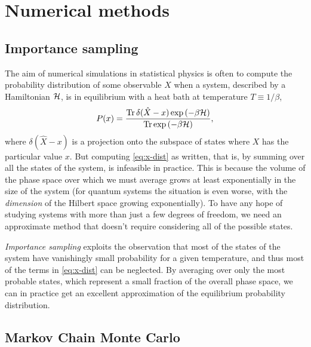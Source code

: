 \chapter{Numerical methods}
\label{chap:numerical}


\section{Importance sampling}

The aim of numerical simulations in statistical physics is often to compute the
probability distribution of some observable $X$ when a system, described by a
Hamiltonian $\mathcal{H}$, is in equilibrium with a heat bath at temperature $T \equiv
1/\beta$,
\begin{equation}
  P(x) =
  \frac{\operatorname{Tr} \delta(\hat{X}-x)\exp\left(-\beta \mathcal{H}\right)}
       {\operatorname{Tr} \exp\left(-\beta \mathcal{H}\right)},
  \label{eq:x-dist}
\end{equation}
where $\delta(\hat{X}-x)$ is a projection onto the subspace of states where $X$
has the particular value $x$. But computing \cref{eq:x-dist} as written, that
is, by summing over all the states of the system, is infeasible in practice.
This is because the volume of the phase space over which we must average grows
at least exponentially in the size of the system (for quantum systems the
situation is even worse, with the \emph{dimension} of the Hilbert space growing
exponentially). To have any hope of studying systems with more than just a few
degrees of freedom, we need an approximate method that doesn't require
considering all of the possible states.

\emph{Importance sampling} exploits the observation that most of the states of
the system have vanishingly small probability for a given temperature, and thus
most of the terms in \cref{eq:x-dist} can be neglected. By averaging over only
the most probable states, which represent a small fraction of the overall phase
space, we can in practice get an excellent approximation of the equilibrium
probability distribution.


\section{Markov Chain Monte Carlo}

